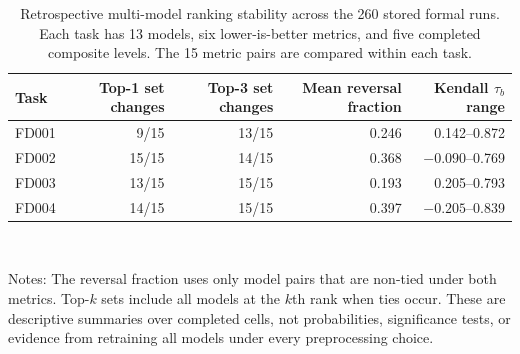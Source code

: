 \begin{table}[!t]
\centering
\scriptsize
\setlength{\tabcolsep}{4pt}
\caption{Retrospective multi-model ranking stability across the 260 stored formal runs. Each task has 13 models, six lower-is-better metrics, and five completed composite levels. The 15 metric pairs are compared within each task.}
\label{tab:multimodel-rank-stability}
\begin{tabular}{@{}lrrrr@{}}
\toprule
Task & Top-1 set changes & Top-3 set changes & Mean reversal fraction & Kendall $\tau_b$ range \\
\midrule
FD001 & 9/15 & 13/15 & 0.246 & 0.142--0.872 \\
FD002 & 15/15 & 14/15 & 0.368 & $-0.090$--0.769 \\
FD003 & 13/15 & 15/15 & 0.193 & 0.205--0.793 \\
FD004 & 14/15 & 15/15 & 0.397 & $-0.205$--0.839 \\
\bottomrule
\end{tabular}
\\[-2pt]
\begin{minipage}{0.94\linewidth}
\footnotesize
Notes: The reversal fraction uses only model pairs that are non-tied under both metrics. Top-$k$ sets include all models at the $k$th rank when ties occur. These are descriptive summaries over completed cells, not probabilities, significance tests, or evidence from retraining all models under every preprocessing choice.
\end{minipage}
\end{table}
